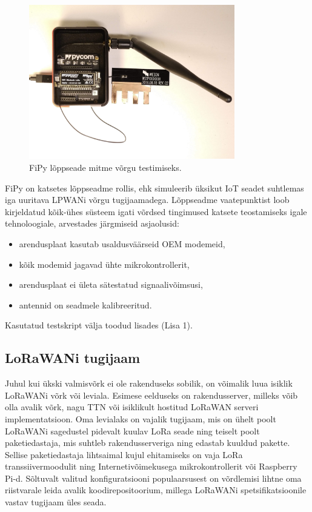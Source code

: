 \documentclass[12pt]{article}
\begin{document}
\begin{figure} [ht] %
    \begin{center}
        \includegraphics[width=0.8\textwidth]{figures/fipy.jpg}
        \caption{FiPy lõppseade mitme võrgu testimiseks.}
        \label{fig:fipy}
    \end{center}
\end{figure}

FiPy on katsetes lõppseadme rollis, ehk simuleerib üksikut IoT seadet suhtlemas iga uuritava LPWANi võrgu tugijaamadega.
Lõppseadme vaatepunktist loob kirjeldatud kõik-ühes süsteem igati võrdsed tingimused katsete teostamiseks igale tehnoloogiale, arvestades järgmiseid asjaolusid:
\begin{itemize}
    \item arendusplaat kasutab usaldusväärseid OEM modemeid,
    \item kõik modemid jagavad ühte mikrokontrollerit,
    \item arendusplaat ei ületa sätestatud signaalivõimsusi,
    \item antennid on seadmele kalibreeritud.
\end{itemize}
Kasutatud testskript välja toodud lisades (Lisa 1).

\subsection{LoRaWANi tugijaam}

Juhul kui ükski valmisvõrk ei ole rakenduseks sobilik, on võimalik luua isiklik LoRaWANi võrk või leviala.
Esimese eelduseks on rakendusserver, milleks võib olla avalik võrk, nagu TTN või isiklikult hostitud LoRaWAN serveri implementatsioon.
Oma levialaks on vajalik tugijaam, mis on ühelt poolt LoRaWANi sagedustel pidevalt kuulav LoRa seade ning teiselt poolt paketiedastaja, mis suhtleb rakendusserveriga ning edastab kuuldud pakette.
Sellise paketiedastaja lihtsaimal kujul ehitamiseks on vaja LoRa transsiivermoodulit ning Internetivõimekusega mikrokontrollerit või Raspberry Pi-d.
Sõltuvalt valitud konfiguratsiooni populaarsusest on võrdlemisi lihtne oma riistvarale leida avalik koodirepositoorium, millega LoRaWANi spetsifikatsioonile vastav tugijaam üles seada.
\end{document}
